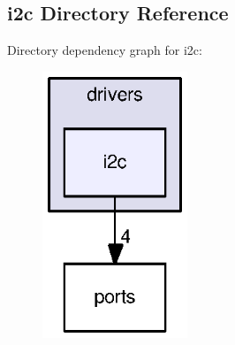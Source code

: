 \subsection{i2c Directory Reference}
\label{dir_7f11b7105d32a1e996bda272d9ee8afd}
Directory dependency graph for i2c\+:
\nopagebreak
\begin{figure}[H]
\begin{center}
\leavevmode
\includegraphics[width=123pt]{dir_7f11b7105d32a1e996bda272d9ee8afd_dep}
\end{center}
\end{figure}
